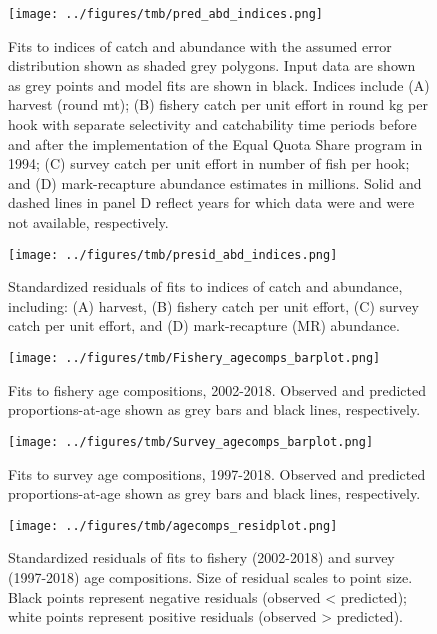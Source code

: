 \documentclass[]{article}
\begin{document}
\begin{figure}
\centering
\texttt{[image: ../figures/tmb/pred\_abd\_indices.png]}
\caption{\label{fig:predabdind}Fits to indices of catch and abundance with
the assumed error distribution shown as shaded grey polygons. Input data
are shown as grey points and model fits are shown in black. Indices
include (A) harvest (round mt); (B) fishery catch per unit effort in
round kg per hook with separate selectivity and catchability time
periods before and after the implementation of the Equal Quota Share
program in 1994; (C) survey catch per unit effort in number of fish per
hook; and (D) mark-recapture abundance estimates in millions. Solid and
dashed lines in panel D reflect years for which data were and were not
available, respectively.}
\end{figure}

\begin{figure}
\centering
\texttt{[image: ../figures/tmb/presid\_abd\_indices.png]}
\caption{\label{fig:residabdind}Standardized residuals of fits to indices of
catch and abundance, including: (A) harvest, (B) fishery catch per unit
effort, (C) survey catch per unit effort, and (D) mark-recapture (MR)
abundance.}
\end{figure}

\begin{figure}
\centering
\texttt{[image: ../figures/tmb/Fishery\_agecomps\_barplot.png]}
\caption{\label{fig:fshage}Fits to fishery age compositions, 2002-2018.
Observed and predicted proportions-at-age shown as grey bars and black
lines, respectively.}
\end{figure}

\begin{figure}
\centering
\texttt{[image: ../figures/tmb/Survey\_agecomps\_barplot.png]}
\caption{\label{fig:srvage}Fits to survey age compositions, 1997-2018.
Observed and predicted proportions-at-age shown as grey bars and black
lines, respectively.}
\end{figure}

\begin{figure}
\centering
\texttt{[image: ../figures/tmb/agecomps\_residplot.png]}
\caption{\label{fig:residage}Standardized residuals of fits to fishery
(2002-2018) and survey (1997-2018) age compositions. Size of residual
scales to point size. Black points represent negative residuals
(observed \textless{} predicted); white points represent positive
residuals (observed \textgreater{} predicted).}
\end{figure}
\end{document}
